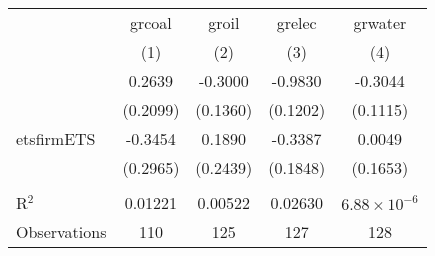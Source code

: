 \begin{tabular}{lcccc}
\toprule
&grcoal&groil&grelec&grwater\\
&(1) & (2) & (3) & (4)\\
\midrule (Intercept)&0.2639 & -0.3000 & -0.9830 & -0.3044\\
  &(0.2099) & (0.1360) & (0.1202) & (0.1115)\\
etsfirmETS&-0.3454 & 0.1890 & -0.3387 & 0.0049\\
  &(0.2965) & (0.2439) & (0.1848) & (0.1653)\\
 &  & & & \\
R$^2$ & 0.01221&0.00522&0.02630&$6.88\times 10^{-6}$\\
Observations & 110&125&127&128\\
\bottomrule
\end{tabular}


